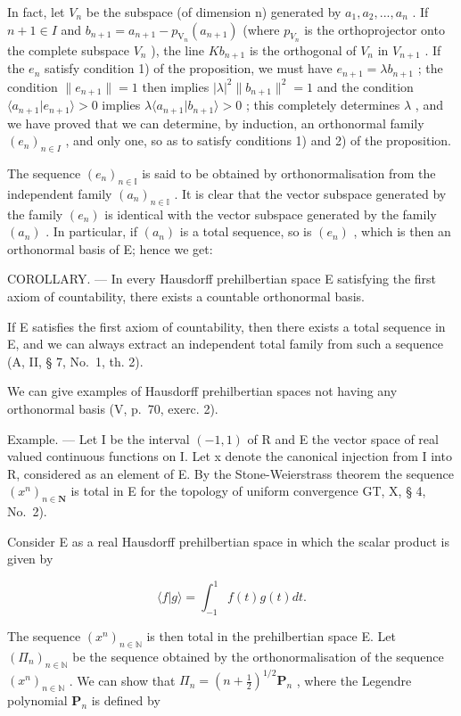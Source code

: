 In fact, let \(V_{n}\) be the subspace (of dimension n) generated by \(a_{1}, a_{2}, ..., a_{n}\) . If \(n + 1 \in I\) and \(b_{n+1} = a_{n+1} - p_{\mathrm{V}_{n}}(a_{n+1})\) (where \(p_{V_{n}}\) is the orthoprojector onto the complete subspace \(V_{n}\) ), the line \(Kb_{n+1}\) is the orthogonal of \(V_{n}\) in \(V_{n+1}\) . If the \(e_{n}\) satisfy condition 1) of the proposition, we must have \(e_{n+1} = \lambda b_{n+1}\) ; the condition \(\|e_{n+1}\| = 1\) then implies \(|\lambda|^2 \|b_{n+1}\|^2 = 1\) and the condition \(\langle a_{n+1}|e_{n+1} \rangle > 0\) implies \(\lambda \langle a_{n+1}|b_{n+1} \rangle > 0\) ; this completely determines \(\lambda\) , and we have proved that we can determine, by induction, an orthonormal family \((e_n)_{n\in I}\) , and only one, so as to satisfy conditions 1) and 2) of the proposition.

The sequence \((e_{n})_{n\in\mathbb{I}}\) is said to be obtained by orthonormalisation from the independent family \((a_{n})_{n\in\mathbb{I}}\) . It is clear that the vector subspace generated by the family \((e_{n})\) is identical with the vector subspace generated by the family \((a_{n})\) . In particular, if \((a_{n})\) is a total sequence, so is \((e_{n})\) , which is then an orthonormal basis of E; hence we get:

COROLLARY. --- In every Hausdorff prehilbertian space E satisfying the first axiom of countability, there exists a countable orthonormal basis.

If E satisfies the first axiom of countability, then there exists a total sequence in E, and we can always extract an independent total family from such a sequence (A, II, § 7, No.~1, th. 2).

We can give examples of Hausdorff prehilbertian spaces not having any orthonormal basis (V, p.~70, exerc. 2).

Example. --- Let I be the interval \((-1,1)\) of R and E the vector space of real valued continuous functions on I. Let x denote the canonical injection from I into R, considered as an element of E. By the Stone-Weierstrass theorem the sequence \((x^{n})_{n\in\mathbf{N}}\) is total in E for the topology of uniform convergence GT, X, § 4, No.~2).

Consider E as a real Hausdorff prehilbertian space in which the scalar product is given by

\[
\langle f | g \rangle = \int_ {- 1} ^ {1} f (t) g (t) d t.
\]

The sequence \((x^{n})_{n\in \mathbb{N}}\) is then total in the prehilbertian space E. Let \((\Pi_n)_{n\in \mathbb{N}}\) be the sequence obtained by the orthonormalisation of the sequence \((x^n)_{n\in \mathbb{N}}\) . We can show that \(\Pi_n = (n + \frac{1}{2})^{1 / 2}\mathbf{P}_n\) , where the Legendre polynomial \(\mathbf{P}_n\) is defined by

